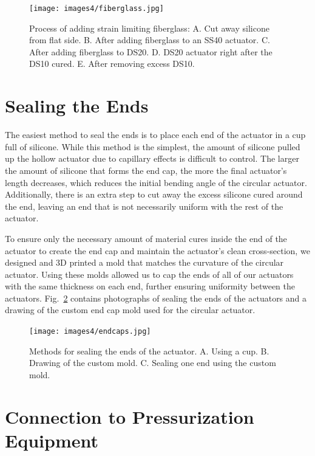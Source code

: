 \begin{figure}[ht!]
    \centering
    \texttt{[image: images4/fiberglass.jpg]}
    \caption{Process of adding strain limiting fiberglass: A. Cut away silicone from flat side. B. After adding fiberglass to an SS40 actuator. C. After adding fiberglass to DS20. D. DS20 actuator right after the DS10 cured. E. After removing excess DS10.}
    \label{fig:fiberglass}
\end{figure}

\clearpage
\section{Sealing the Ends}

The easiest method to seal the ends is to place each end of the actuator in a cup full of silicone. While this method is the simplest, the amount of silicone pulled up the hollow actuator due to capillary effects is difficult to control. The larger the amount of silicone that forms the end cap, the more the final actuator's length decreases, which reduces the initial bending angle of the circular actuator. Additionally, there is an extra step to cut away the excess silicone cured around the end, leaving an end that is not necessarily uniform with the rest of the actuator. 

To ensure only the necessary amount of material cures inside the end of the actuator to create the end cap and maintain the actuator's clean cross-section, we designed and 3D printed a mold that matches the curvature of the circular actuator. Using these molds allowed us to cap the ends of all of our actuators with the same thickness on each end, further ensuring uniformity between the actuators. Fig.~\ref{fig:endcaps} contains photographs of sealing the ends of the actuators and a drawing of the custom end cap mold used for the circular actuator. \\

\begin{figure}[ht!]
    \centering
    \texttt{[image: images4/endcaps.jpg]}
    \caption{Methods for sealing the ends of the actuator. A. Using a cup. B. Drawing of the custom mold. C. Sealing one end using the custom mold.}
    \label{fig:endcaps}
\end{figure}

\clearpage
\section{Connection to Pressurization Equipment}

